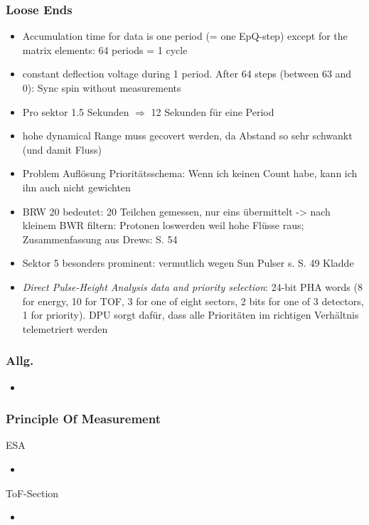 \documentclass[]{article}
\begin{document}
\subsubsection{Loose Ends}
\begin{itemize}
	\item Accumulation time for data is one period (= one EpQ-step) except for the matrix elements: 64 periods = 1 cycle
	\item constant deflection voltage during 1 period. After 64 steps (between 63 and 0): Sync spin without measurements
	\item Pro sektor 1.5 Sekunden $\Rightarrow$ 12 Sekunden für eine Period
	\item hohe dynamical Range muss gecovert werden, da Abstand so sehr schwankt (und damit Fluss)
	\item Problem Auflösung Prioritätsschema: Wenn ich keinen Count habe, kann ich ihn auch nicht gewichten
	\item BRW 20 bedeutet: 20 Teilchen gemessen, nur eins übermittelt -> nach kleinem BWR filtern: Protonen loswerden weil hohe Flüsse raus; Zusammenfassung aus Drews: S. 54
	\item Sektor 5 besonders prominent: vermutlich wegen Sun Pulser s. S. 49 Kladde
	\item \textit{Direct Pulse-Height Analysis data and priority selection}: 24-bit PHA words (8 for energy, 10 for TOF, 3 for one of eight sectors, 2 bits for one of 3 detectors, 1 for priority). DPU sorgt dafür, dass alle Prioritäten im richtigen Verhältnis telemetriert werden
\end{itemize}
\subsubsection{Allg.}
\begin{itemize}
	\item

\end{itemize}

\subsubsection{Principle Of Measurement}
ESA
\begin{itemize}
	\item
\end{itemize}
ToF-Section
\begin{itemize}
	\item
\end{itemize}
%
%
%
\end{document}
